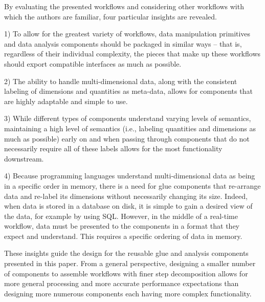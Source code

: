 \documentclass[conference]{IEEEtran}
\begin{document}
By evaluating the presented workflows and considering other workflows with
which the authors are familiar, four particular insights are revealed.

1) To allow for the greatest variety of workflows, data manipulation
  primitives and data analysis components should be packaged in similar ways --
  that is, regardless of their individual complexity, the pieces that make up
  these workflows should export compatible interfaces as much as possible.

2) The ability to handle multi-dimensional data, along with the consistent
  labeling of dimensions and quantities as meta-data, allows for components that
  are highly adaptable and simple to use.

3) While different types of components understand varying levels of
  semantics, maintaining a high level of semantics (i.e., labeling quantities and
  dimensions as much as possible) early on and when passing through components
  that do not necessarily require all of these labels allows for the most
  functionality downstream.

4) Because programming languages understand multi-dimensional data as being
  in a specific order in memory, there is a need for glue components that re-arrange
  data and re-label its dimensions without necessarily changing its size. Indeed,
  when data is stored in a database on disk, it is simple to gain a desired
  view of the data, for example by using SQL. However, in the middle of a
  real-time workflow, data must be presented to the components in a format that
  they expect and understand. This requires a specific ordering of
  data in memory.

These insights guide the design for the reusable glue and analysis
components presented in this
paper. From a general perspective, designing a smaller number of
components to assemble workflows with finer step decomposition
allows for more general processing and more accurate performance
expectations than designing more numerous components each having more
complex functionality.

\end{document}
